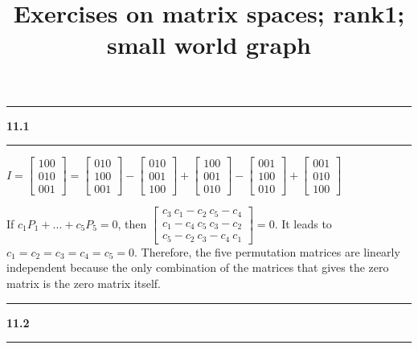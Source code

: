 \documentclass[11pt]{article}
\newcommand\question[2]{\vspace{.25in}\hrule\textbf{#1 #2}\vspace{.5em}\hrule\vspace{.10in}}
\begin{document}
\raggedright
\newcommand\NAME{Haiying Cui}  %
\newcommand\ANDREWID{Christy}     %
\newcommand\HWNUM{11}              %

\title{Exercises on matrix spaces; rank1; small world graph}
\maketitle

\question{11.1}{}
\(I = \begin{bmatrix} 1 0 0 \\ 0 1 0 \\ 0 0 1\end{bmatrix} = \begin{bmatrix} 0 1 0 \\ 1 0 0 \\ 0 0 1\end{bmatrix} - \begin{bmatrix} 0 1 0 \\ 0 0 1 \\ 1 0 0 \end{bmatrix} + \begin{bmatrix} 1 0 0 \\ 0 0 1 \\ 0 1 0 \end{bmatrix} - \begin{bmatrix} 0 0 1 \\ 1 0 0 \\ 0 1 0 \end{bmatrix} + \begin{bmatrix} 0 0 1 \\ 0 1 0 \\ 1 0 0\end{bmatrix}\)

If \(c_1P_1 + ... + c_5P_5 = 0 \), then \(\begin{bmatrix} c_3 \ c_1 - c_2 \ c_5-c_4 \\ c_1 - c_4 \ c_5 \ c_3 - c_2 \\ c_5 - c_2 \ c_3 - c_4 \ c_1 \end{bmatrix} = 0\). It leads to \(c_1 = c_2 = c_3 = c_4 = c_5 = 0\). Therefore, the five permutation matrices are linearly independent because the only combination of the matrices that gives the zero matrix is the zero matrix itself. 
\question{11.2}{}
\end{document}
